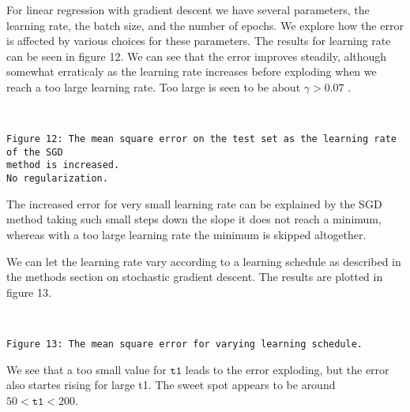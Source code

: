 \documentclass[11pt]{article}
\begin{document}
    For linear regression with gradient descent we have several parameters,
the learning rate, the batch size, and the number of epochs. We explore
how the error is affected by various choices for these parameters. The
results for learning rate can be seen in figure 12. We can see that the
error improves steadily, although somewhat erraticaly as the learning
rate increases before exploding when we reach a too large learning rate.
Too large is seen to be about \(\gamma>0.07\) .



    \begin{center}
    \end{center}
    { \hspace*{\fill} \\}
    
    \begin{Verbatim}[commandchars=\\\{\}]
Figure 12: The mean square error on the test set as the learning rate of the SGD
method is increased.
No regularization.
    \end{Verbatim}

    The increased error for very small learning rate can be explained by the
SGD method taking such small steps down the slope it does not reach a
minimum, whereas with a too large learning rate the minimum is skipped
altogether.

We can let the learning rate vary according to a learning schedule as
described in the methods section on stochastic gradient descent. The
results are plotted in figure 13.

    \begin{center}
    \end{center}
    { \hspace*{\fill} \\}
    
    \begin{Verbatim}[commandchars=\\\{\}]
Figure 13: The mean square error for varying learning schedule.
    \end{Verbatim}

    We see that a too small value for \(\texttt{t1}\) leads to the error
exploding, but the error also startes rising for large t1. The sweet
spot appears to be around \(50<\texttt{t1}<200\).
\end{document}
